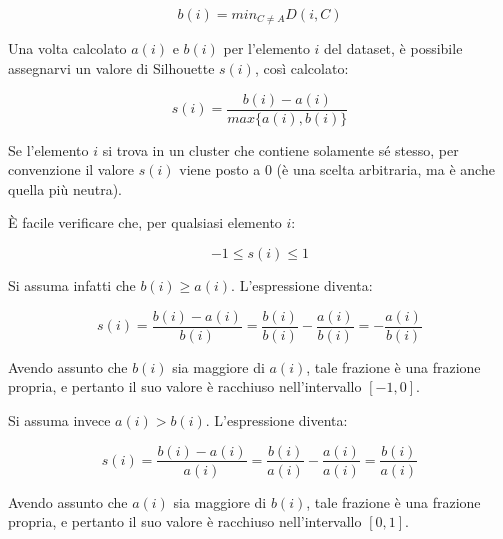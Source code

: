 \documentclass[a4paper, 12pt]{report}
\begin{document}
			\begin{equation}
				b(i) = min_{C \neq A} D(i, C)
			\end{equation}

			Una volta calcolato $a(i)$ e $b(i)$ per l'elemento $i$ del dataset, è
			possibile assegnarvi un valore di Silhouette $s(i)$, così calcolato:

			\begin{equation}
				s(i) = \frac{b(i) - a(i)}{max\{a(i), b(i)\}}
			\end{equation}

			Se l'elemento $i$ si trova in un cluster che contiene solamente sé stesso,
			per convenzione il valore $s(i)$ viene posto a $0$ (è una scelta arbitraria,
			ma è anche quella più neutra).

			È facile verificare che, per qualsiasi elemento $i$:

			\begin{equation*}
				-1 \leq s(i) \leq 1
			\end{equation*}

			Si assuma infatti che $b(i) \geq a(i)$. L'espressione diventa:

			\begin{equation*}
				s(i) = \frac{b(i) - a(i)}{b(i)} =
				\frac{b(i)}{b(i)} - \frac{a(i)}{b(i)} =
				- \frac{a(i)}{b(i)}
			\end{equation*}

			Avendo assunto che $b(i)$ sia maggiore di $a(i)$, tale frazione è una
			frazione propria, e pertanto il suo valore è racchiuso nell'intervallo
			$[-1, 0]$.

			Si assuma invece $a(i) > b(i)$. L'espressione diventa:

			\begin{equation*}
				s(i) = \frac{b(i) - a(i)}{a(i)} =
				\frac{b(i)}{a(i)} - \frac{a(i)}{a(i)} =
				\frac{b(i)}{a(i)}
			\end{equation*}

			Avendo assunto che $a(i)$ sia maggiore di $b(i)$, tale frazione è una
			frazione propria, e pertanto il suo valore è racchiuso nell'intervallo
			$[0, 1]$.

\end{document}
